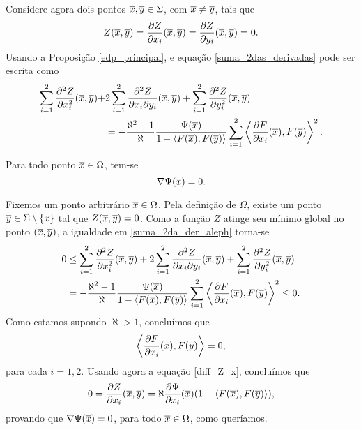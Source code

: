 Considere agora dois pontos $\overline{x},\overline{y}\in\Sigma$, com $\overline{x}\neq\overline{y}$,
tais que
\[
Z(\overline{x},\overline{y}) = \frac{\partial Z}{\partial x_i}(\overline{x},\overline{y}) 
= \frac{\partial Z}{\partial y_i}(\overline{x},\overline{y}) = 0.
\]
Usando a Proposi\c c\~ao \ref{edp_principal}, e equação
\eqref{suma_2das_derivadas} pode ser escrita como
\begin{equation} \label{suma_2da_der_aleph}
\begin{aligned}
\sum_{i=1}^2 \frac{\partial^2 Z}{\partial x_i^2}(\overline{x},\overline{y}) + & 
2 \sum_{i=1}^2 \frac{\partial^2 Z}{\partial x_i \partial y_i}(\overline{x},\overline{y}) + 
\sum_{i=1}^2 \frac{\partial^2 Z}{\partial y_i^2}(\overline{x},\overline{y})  \\
& = - 
\frac{\aleph^2 - 1}{\aleph} \frac{\Psi(\overline{x})}{1 - \langle F(\overline{x}), 
F(\overline{y}) \rangle} \sum_{i=1}^2 \left\langle \frac{\partial F}
{\partial x_i}(\overline{x}), F(\overline{y}) \right\rangle^2.
\end{aligned}
\end{equation}



\begin{proposicao} \label{gradiente_nulo}
Para todo ponto $\overline{x}\in\Omega$, tem-se
\[
\nabla \Psi(\overline{x})=0.
\] 
\end{proposicao}
\begin{demonstracao}
Fixemos um ponto arbitr\'ario $\overline{x}\in\Omega$. Pela defini\c c\~ao
de $\Omega$, existe um ponto $\overline{y}\in\Sigma\setminus\{x\}$ tal que 
$Z(\overline{x},\overline{y})=0$. Como a fun\c c\~ao $Z$ atinge seu m\'inimo
global no ponto $(\overline{x},\overline{y})$, a igualdade em 
\eqref{suma_2da_der_aleph} torna-se
\begin{equation*} 
\begin{aligned}
0 & \leq
\sum_{i=1}^2 \frac{\partial^2 Z}{\partial x_i^2}(\overline{x},\overline{y}) + 
2 \sum_{i=1}^2 \frac{\partial^2 Z}{\partial x_i \partial y_i}(\overline{x},\overline{y}) + 
\sum_{i=1}^2 \frac{\partial^2 Z}{\partial y_i^2}(\overline{x},\overline{y})  \\
& = - 
\frac{\aleph^2 - 1}{\aleph} \frac{\Psi(\overline{x})}{1 - \langle F(\overline{x}), 
F(\overline{y}) \rangle} \sum_{i=1}^2 \left\langle \frac{\partial F}
{\partial x_i}(\overline{x}), F(\overline{y}) \right\rangle^2 \leq 0.
\end{aligned}
\end{equation*}
Como estamos supondo $\aleph>1$, conclu\'imos que
\[
\left\langle \frac{\partial F}{\partial x_i}(\overline{x}), F(\overline{y}) \right\rangle = 0,
\]
para cada $i=1,2$. Usando agora a equação \eqref{diff_Z_x},
conclu\'imos que 
\[
0 = \frac{\partial Z}{\partial x_i}(\overline{x},\overline{y}) = 
\aleph \frac{\partial \Psi}{\partial x_i}(\overline{x})
(1 - \langle F(\overline{x}),F(\overline{y}) \rangle),
\]
provando que $\nabla\Psi(\overline{x})=0$, para todo $\overline{x}\in\Omega$, como
quer\'iamos.
\end{demonstracao}

